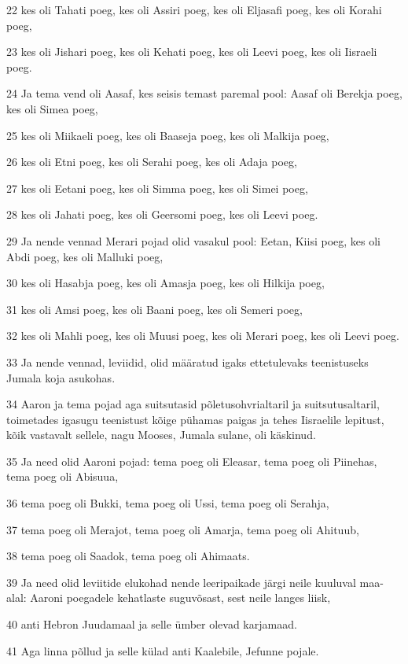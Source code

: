 \par 22 kes oli Tahati poeg, kes oli Assiri poeg, kes oli Eljasafi poeg, kes oli Korahi poeg,
\par 23 kes oli Jishari poeg, kes oli Kehati poeg, kes oli Leevi poeg, kes oli Iisraeli poeg.
\par 24 Ja tema vend oli Aasaf, kes seisis temast paremal pool: Aasaf oli Berekja poeg, kes oli Simea poeg,
\par 25 kes oli Miikaeli poeg, kes oli Baaseja poeg, kes oli Malkija poeg,
\par 26 kes oli Etni poeg, kes oli Serahi poeg, kes oli Adaja poeg,
\par 27 kes oli Eetani poeg, kes oli Simma poeg, kes oli Simei poeg,
\par 28 kes oli Jahati poeg, kes oli Geersomi poeg, kes oli Leevi poeg.
\par 29 Ja nende vennad Merari pojad olid vasakul pool: Eetan, Kiisi poeg, kes oli Abdi poeg, kes oli Malluki poeg,
\par 30 kes oli Hasabja poeg, kes oli Amasja poeg, kes oli Hilkija poeg,
\par 31 kes oli Amsi poeg, kes oli Baani poeg, kes oli Semeri poeg,
\par 32 kes oli Mahli poeg, kes oli Muusi poeg, kes oli Merari poeg, kes oli Leevi poeg.
\par 33 Ja nende vennad, leviidid, olid määratud igaks ettetulevaks teenistuseks Jumala koja asukohas.
\par 34 Aaron ja tema pojad aga suitsutasid põletusohvrialtaril ja suitsutusaltaril, toimetades igasugu teenistust kõige pühamas paigas ja tehes Iisraelile lepitust, kõik vastavalt sellele, nagu Mooses, Jumala sulane, oli käskinud.
\par 35 Ja need olid Aaroni pojad: tema poeg oli Eleasar, tema poeg oli Piinehas, tema poeg oli Abisuua,
\par 36 tema poeg oli Bukki, tema poeg oli Ussi, tema poeg oli Serahja,
\par 37 tema poeg oli Merajot, tema poeg oli Amarja, tema poeg oli Ahituub,
\par 38 tema poeg oli Saadok, tema poeg oli Ahimaats.
\par 39 Ja need olid leviitide elukohad nende leeripaikade järgi neile kuuluval maa-alal: Aaroni poegadele kehatlaste suguvõsast, sest neile langes liisk,
\par 40 anti Hebron Juudamaal ja selle ümber olevad karjamaad.
\par 41 Aga linna põllud ja selle külad anti Kaalebile, Jefunne pojale.
